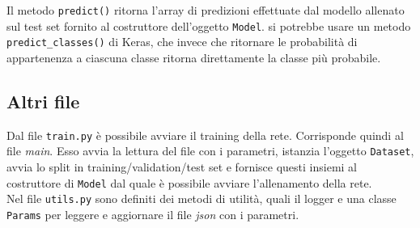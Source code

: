 Il metodo \texttt{predict()} ritorna l'array di predizioni effettuate dal modello allenato sul test set fornito al costruttore dell'oggetto \texttt{Model}.  si potrebbe usare un metodo \texttt{predict\_classes()} di Keras, che invece che ritornare le probabilità di appartenenza a ciascuna classe ritorna direttamente la classe più probabile.

\subsection{Altri file}

Dal file \texttt{train.py} è possibile avviare il training della rete. Corrisponde quindi al file \textit{main}. Esso avvia la lettura del file con i parametri, istanzia l'oggetto \texttt{Dataset}, avvia lo split in training/validation/test set e fornisce questi insiemi al costruttore di \texttt{Model} dal quale è possibile avviare l'allenamento della rete.\\

Nel file \texttt{utils.py} sono definiti dei metodi di utilità, quali il logger e una classe \texttt{Params} per leggere e aggiornare il file \textit{json} con i parametri.

